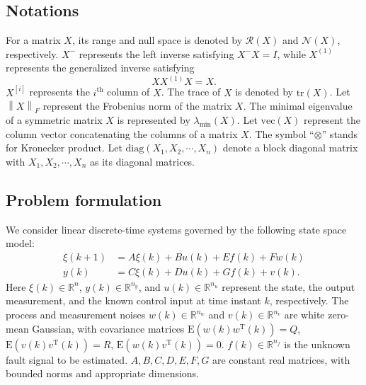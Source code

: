 \documentclass[twocolumn]{autart}
\begin{document}
\subsection{Notations}
For a matrix $X$, its range and null space is denoted by $\mathcal{R}\left( X \right)$ and $\mathcal{N}\left( X \right)$, respectively. $X^{-}$ represents the left inverse satisfying $X^{-} X = I$, while $X^{(1)}$ represents the generalized inverse satisfying
\begin{equation}\label{eq:ginv}
X X^{(1)} X = X.
\end{equation}
$X^{[i]}$ represents the $i^{\mathrm{th}}$ column of $X$. The trace of $X$ is denoted by $\mathrm{tr}\left( X \right)$. Let $\left\| X \right\|_F$ represent the Frobenius norm of the matrix $X$. The minimal eigenvalue of a symmetric matrix $X$ is represented by $\lambda_{\text{min}} \left( X \right)$. Let $\mathrm{vec}\left( X \right)$ represent the column vector concatenating the columns of a matrix $X$. The symbol ``$\otimes$'' stands for Kronecker product. Let $\mathrm{diag}\left( X_1, X_2, \cdots, X_n \right)$ denote a block diagonal matrix with $X_1, X_2, \cdots, X_n$ as its diagonal matrices.




\subsection{Problem formulation}\label{sect:system_descrip}
We consider linear discrete-time systems governed by the following state space model:
\begin{equation}\label{eq:sys}
\begin{aligned}
\xi (k+1) &= A \xi(k) + Bu(k) + E f(k) + F w(k) \\
y(k) &= C \xi (k) + Du(k) + G f(k) + v(k).
\end{aligned}
\end{equation}
Here $\xi (k)\in\mathbb{R}^{n}$, $y(k)\in\mathbb{R}^{n_y}$, and $u(k)\in\mathbb{R}^{n_u}$ represent the state, the output measurement, and the known control input at time instant $k$, respectively. The process and measurement noises $w(k)\in \mathbb{R}^{n_w}$ and $v(k) \in \mathbb{R}^{n_v}$ are white zero-mean Gaussian, with covariance matrices
$\mathrm{E}\left( w(k) w^\mathrm{T}(k) \right) = Q$,
$\mathrm{E}\left( v(k) v^\mathrm{T}(k) \right) = R$,
$\mathrm{E}\left( w(k) v^\mathrm{T}(k) \right) = 0$.
$f(k)\in\mathbb{R}^{n_f}$ is the unknown fault signal to be estimated.
$A, B, C, D, E, F, G$ are constant real matrices, with bounded norms and appropriate dimensions.
\end{document}
